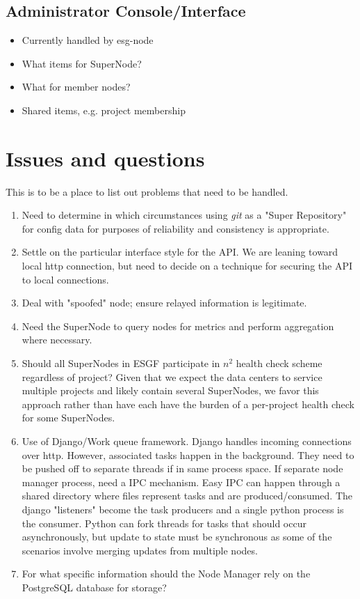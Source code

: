 \documentclass[oneside,12pt]{memoir}
\begin{document}
\subsection{Administrator Console/Interface}
\begin{itemize}
\item
Currently handled by esg-node
\item
What items for SuperNode?
\item
What for member nodes?
\item
Shared items, e.g. project membership
\end{itemize}



\section{Issues and questions}
This is to be a place to list out problems that need to be handled.
\begin{enumerate}

\item
Need to determine in which circumstances using \emph{git} as a "Super Repository"  for config data for purposes of reliability and consistency is appropriate.
\item
Settle on the particular interface style for the API.  We are leaning toward local http connection, but need to decide on a technique for securing the API to local connections.

\item
Deal with "spoofed" node; ensure relayed information is legitimate. 
\item
Need the SuperNode to query nodes for metrics and perform aggregation where necessary.
\item
Should all SuperNodes in ESGF participate in $n^2$ health check scheme regardless of project? Given that we expect the data centers to service multiple projects and likely contain several SuperNodes, we favor this approach rather than have each have the burden of a per-project health check for some SuperNodes.
\item  Use of Django/Work queue framework.  Django handles incoming connections over http.  However, associated tasks happen in the background.  They need to be pushed off to separate threads if in same process space.  If separate node manager process, need a IPC mechanism.  Easy IPC can happen through a shared directory where files represent tasks and are produced/consumed.  The django "listeners" become the task producers and a single python process is the consumer.   Python can fork threads for tasks that should occur asynchronously, but update to state must be synchronous as some of the scenarios involve merging updates from multiple nodes.
\item
For what specific information should the Node Manager rely on the PostgreSQL database for storage?


\end{enumerate}
\end{document}
